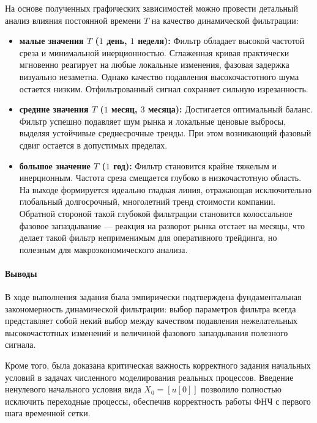 На основе полученных графических зависимостей можно провести детальный анализ влияния постоянной времени $T$ на качество динамической фильтрации:

\begin{itemize}
    \item \textbf{малые значения $T$ ($1$ день, $1$ неделя):} Фильтр обладает высокой частотой среза и минимальной инерционностью. Сглаженная кривая практически мгновенно реагирует на любые локальные изменения, фазовая задержка визуально незаметна. Однако качество подавления высокочастотного шума остается низким. Отфильтрованный сигнал сохраняет сильную изрезанность.

    \item \textbf{средние значения $T$ ($1$ месяц, $3$ месяца):} Достигается оптимальный баланс. Фильтр успешно подавляет шум рынка и локальные ценовые выбросы, выделяя устойчивые среднесрочные тренды. При этом возникающий фазовый сдвиг остается в допустимых пределах.

    \item \textbf{большое значение $T$ ($1$ год):} Фильтр становится крайне тяжелым и инерционным. Частота среза смещается глубоко в низкочастотную область. На выходе формируется идеально гладкая линия, отражающая исключительно глобальный долгосрочный, многолетний тренд стоимости компании. Обратной стороной такой глубокой фильтрации становится колоссальное фазовое запаздывание — реакция на разворот рынка отстает на месяцы, что делает такой фильтр неприменимым для оперативного трейдинга, но полезным для макроэкономического анализа.
\end{itemize}

\paragraph{Выводы}
В ходе выполнения задания была эмпирически подтверждена фундаментальная закономерность динамической фильтрации: выбор параметров фильтра всегда представляет собой некий выбор между качеством подавления нежелательных высокочастотных изменений и величиной фазового запаздывания полезного сигнала.

Кроме того, была доказана критическая важность корректного задания начальных условий в задачах численного моделирования реальных процессов. Введение ненулевого начального условия вида $X_0 = [u[0]]$ позволило полностью исключить переходные процессы, обеспечив корректность работы ФНЧ с первого шага временной сетки.